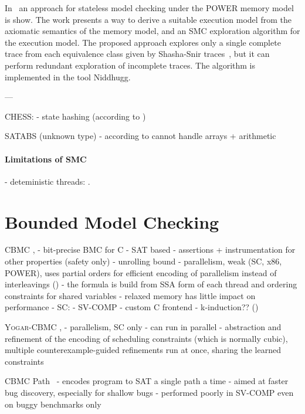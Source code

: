 In~\cite{Abdulla2016} an approach for stateless model checking under the POWER memory model is show.
The work presents a way to derive a suitable execution model from the axiomatic semantics of the memory model, and an SMC exploration algorithm for the execution model.
The proposed approach explores only a single complete trace from each equivalence class given by Shasha-Snir traces~\cite{Shasha1988}, but it can perform redundant exploration of incomplete traces. 
The algorithm is implemented in the tool Niddhugg.


---

CHESS:
- state hashing (according to \cite{Cordeiro2011})


SATABS (unknown type)
- according to \cite{Cordeiro2011} cannot handle arrays + arithmetic



\paragraph{Limitations of SMC}

- deteministic threads: \cite{Huang2015:14,Huang2015:27}.


\section{Bounded Model Checking}


CBMC \cite{Kroening2014}, \cite{Clarke2004}
- bit-precise BMC for C
- SAT based
- assertions + instrumentation for other properties (safety only)
- unrolling bound
- parallelism, weak (SC, x86, POWER), uses partial orders  for efficient encoding of parallelism \cite{Alglave2013por} instead of interleavings ()
  - the formula is build from SSA form of each thread and ordering constraints for shared variables
- relaxed memory has little impact on performance
- SC: \cite{Alglave2013por:25}
- SV-COMP
- custom C frontend
- k-induction?? (\cite{Gadelha2018:7})

\textsc{Yogar-CBMC} \cite{Yin2018}, \cite{Yin2019}
- parallelism, SC only
- can run in parallel
- abstraction and refinement of the encoding of scheduling constraints (which is normally cubic), multiple counterexample-guided refinements run at once, sharing the learned constraints

CBMC Path~\cite{Khazem2019}
- encodes program to SAT a single path a time
- aimed at faster bug discovery, especially for shallow bugs
- performed poorly in SV-COMP even on buggy benchmarks only

